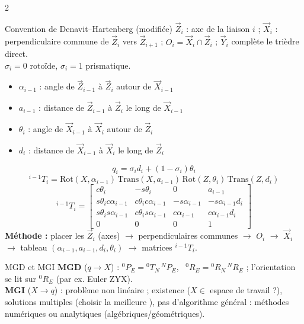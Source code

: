 \documentclass[10pt,a4paper]{article}
\begin{document}
\begin{multicols}{2}
\begin{fbx}{Convention de Denavit--Hartenberg (modifiée)}
$\vec Z_i$ : axe de la liaison $i$ ; $\vec X_i$ : perpendiculaire commune de $\vec Z_i$ vers $\vec Z_{i+1}$ ; $O_i=\vec X_i\cap\vec Z_i$ ; $\vec Y_i$ complète le trièdre direct.\\
$\sigma_i=0$ rotoïde, $\sigma_i=1$ prismatique.
\begin{itemize}
\item $\alpha_{i-1}$ : angle de $\vec Z_{i-1}$ à $\vec Z_i$ autour de $\vec X_{i-1}$
\item $a_{i-1}$ : distance de $\vec Z_{i-1}$ à $\vec Z_i$ le long de $\vec X_{i-1}$
\item $\theta_i$ : angle de $\vec X_{i-1}$ à $\vec X_i$ autour de $\vec Z_i$
\item $d_i$ : distance de $\vec X_{i-1}$ à $\vec X_i$ le long de $\vec Z_i$
\end{itemize}
\[q_i=\sigma_i d_i+(1-\sigma_i)\theta_i\]
\[{}^{i-1}T_i=\mathrm{Rot}(X,\alpha_{i-1})\,\mathrm{Trans}(X,a_{i-1})\,\mathrm{Rot}(Z,\theta_i)\,\mathrm{Trans}(Z,d_i)\]
\[{}^{i-1}T_i=\begin{bmatrix}c\theta_i&-s\theta_i&0&a_{i-1}\\
s\theta_i c\alpha_{i-1}&c\theta_i c\alpha_{i-1}&-s\alpha_{i-1}&-s\alpha_{i-1}d_i\\
s\theta_i s\alpha_{i-1}&c\theta_i s\alpha_{i-1}&c\alpha_{i-1}&c\alpha_{i-1}d_i\\0&0&0&1\end{bmatrix}\]
\textbf{Méthode :} placer les $\vec Z_i$ (axes) $\to$ perpendiculaires communes $\to$ $O_i$ $\to$ $\vec X_i$ $\to$ tableau $(\alpha_{i-1},a_{i-1},d_i,\theta_i)$ $\to$ matrices ${}^{i-1}T_i$.
\end{fbx}

\begin{fbx}{MGD et MGI}
\textbf{MGD} ($q\to X$) : ${}^0P_E={}^0T_N\,{}^NP_E$, \ ${}^0R_E={}^0R_N\,{}^NR_E$ ; l'orientation se lit sur ${}^0R_E$ (par ex. Euler ZYX).\\
\textbf{MGI} ($X\to q$) : problème non linéaire ; existence ($X\in$ espace de travail ?), solutions multiples (choisir la \og meilleure \fg{}), pas d'algorithme général : méthodes numériques ou analytiques (algébriques/géométriques).
\end{fbx}


\end{multicols}
\end{document}
